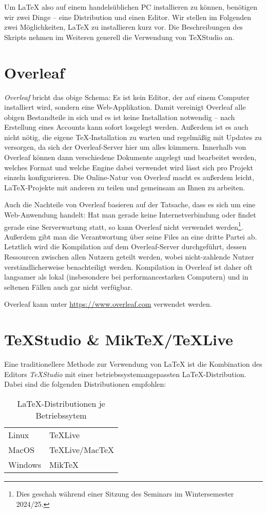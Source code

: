 Um \LaTeX{} also auf einem handelsüblichen PC installieren zu können, benötigen wir zwei Dinge -- eine Distribution und einen Editor.
Wir stellen im Folgenden zwei Möglichkeiten, \LaTeX{} zu installieren kurz vor.
Die Beschreibungen des Skripts nehmen im Weiteren generell die Verwendung von TeXStudio an.

\section{Overleaf}
\emph{Overleaf} bricht das obige Schema: Es ist kein Editor, der auf einem Computer installiert wird, sondern eine Web-Applikation.
Damit vereinigt Overleaf alle obigen Bestandteile in sich und es ist keine Installation notwendig -- nach Erstellung eines Accounts kann sofort losgelegt werden.
Außerdem ist es auch nicht nötig, die eigene \TeX{}-Installation zu warten und regelmäßig mit Updates zu versorgen, da sich der Overleaf-Server hier um alles kümmern.
Innerhalb von Overleaf können dann verschiedene Dokumente angelegt und bearbeitet werden, welches Format und welche Engine dabei verwendet wird lässt sich pro Projekt einzeln konfigurieren.
Die Online-Natur von Overleaf macht es außerdem leicht, \LaTeX{}-Projekte mit anderen zu teilen und gemeinsam an Ihnen zu arbeiten.

Auch die Nachteile von Overleaf basieren auf der Tatsache, dass es sich um eine Web-Anwendung handelt:
Hat man gerade keine Internetverbindung oder findet gerade eine Serverwartung statt, so kann Overleaf nicht verwendet werden\footnote{Dies geschah während einer Sitzung des Seminars im Wintersemester 2024/25.}.
Außerdem gibt man die Verantwortung über seine Files an eine dritte Partei ab.
Letztlich wird die Kompilation auf dem Overleaf-Server durchgeführt, dessen Ressourcen zwischen allen Nutzern geteilt werden, wobei nicht-zahlende Nutzer verständlicherweise benachteiligt werden.
Kompilation in Overleaf ist daher oft langsamer als lokal (insbesondere bei performancestarken Computern) und in seltenen Fällen auch gar nicht verfügbar.

Overleaf kann unter \url{https://www.overleaf.com} verwendet werden.

\section{TeXStudio \& MikTeX/TeXLive}
Eine traditionellere Methode zur Verwendung von \LaTeX{} ist die Kombination des Editors \emph{TeXStudio} mit einer betriebssystemangepassten \LaTeX{}-Distribution.
Dabei sind die folgenden Distributionen empfohlen:
\begin{table}[h]
	\begin{tabular}{l l}
		\toprule
		Linux & TeXLive \tabularnewline
		MacOS & TeXLive/MacTeX \tabularnewline
		Windows & MikTeX \tabularnewline
		\bottomrule
	\end{tabular}
	\caption{\LaTeX{}-Distributionen je Betriebssytem}
\end{table}


